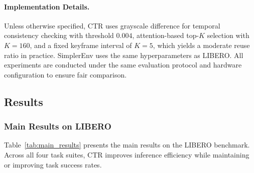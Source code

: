 \documentclass[11pt]{article}
\begin{document}
\paragraph{Implementation Details.}
Unless otherwise specified, CTR uses grayscale difference for temporal consistency checking with threshold $0.004$, attention-based top-$K$ selection with $K=160$, and a fixed keyframe interval of $K=5$, which yields a moderate reuse ratio in practice. SimplerEnv uses the same hyperparameters as LIBERO. All experiments are conducted under the same evaluation protocol and hardware configuration to ensure fair comparison.

\subsection{Results}

\subsubsection{Main Results on LIBERO}

Table~\ref{tab:main_results} presents the main results on the LIBERO benchmark. Across all four task suites, CTR improves inference efficiency while maintaining or improving task success rates.



\begin{table}[t]
\centering
{}
\caption{SimplerEnv results (success rate, \%) using the OpenVLA base checkpoint without task-specific fine-tuning. CTR uses the same hyperparameters as in LIBERO.}
\label{tab:simplerenv}
\end{table}
\end{document}
